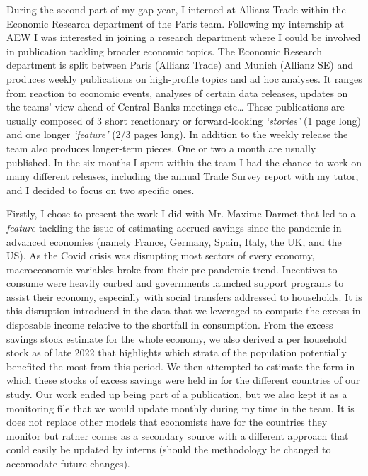 \quad During the second part of my gap year, I interned at Allianz Trade within the Economic Research department of the Paris team. 
Following my internship at AEW I was interested in joining a research department where I could be involved in publication tackling broader economic topics.
The Economic Research department is split between Paris (Allianz Trade) and Munich (Allianz SE) and produces weekly publications on high-profile topics and ad hoc analyses. 
It ranges from reaction to economic events, analyses of certain data releases, updates on the teams’ view ahead of Central Banks meetings etc\dots
These publications are usually composed of 3 short reactionary or forward-looking \textit{‘stories’} (1 page long) and one longer \textit{‘feature’} (2/3 pages long). 
In addition to the weekly release the team also produces longer-term pieces. One or two a month are usually published. 
In the six months I spent within the team I had the chance to work on many different releases, including the annual Trade Survey report with my tutor, and I decided to focus on two specific ones. 

Firstly, I chose to present the work I did with Mr. Maxime Darmet that led to a \textit{feature} tackling the issue of estimating accrued savings since the pandemic in advanced economies (namely France, Germany, Spain, Italy, the UK, and the US). 
As the Covid crisis was disrupting most sectors of every economy, macroeconomic variables broke from their pre-pandemic trend. 
Incentives to consume were heavily curbed and governments launched support programs to assist their economy, especially with social transfers addressed to households. 
It is this disruption introduced in the data that we leveraged to compute the excess in disposable income relative to the shortfall in consumption. 
From the excess savings stock estimate for the whole economy, we also derived a per household stock as of late 2022 that highlights which strata of the population potentially benefited the most from this period. 
We then attempted to estimate the form in which these stocks of excess savings were held in for the different countries of our study. 
Our work ended up being part of a publication\cite{az_savings}, but we also kept it as a monitoring file that we would update monthly during my time in the team. 
It is does not replace other models that economists have for the countries they monitor but rather comes as a secondary source with a different approach that could easily be updated by interns (should the methodology be changed to accomodate future changes).

